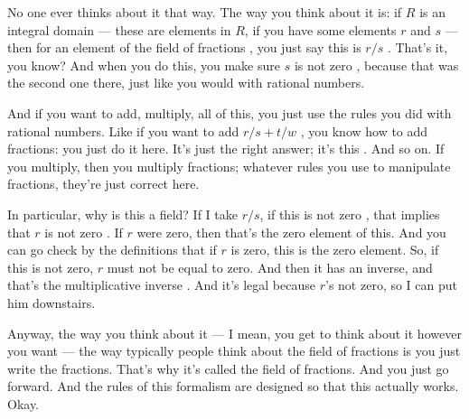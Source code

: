 \begin{speech}[00:01:46 - 00:03:25]
No one ever thinks about it that way. The way you think about it is: if $R$ is an integral domain  --- these are elements in $R$, if you have some elements $r$ and $s$ --- then for an element of the field of fractions , you just say this is $r/s$ . That's it, you know? And when you do this, you make sure $s$ is not zero , because that was the second one there, just like you would with rational numbers.

And if you want to add, multiply, all of this, you just use the rules you did with rational numbers. Like if you want to add $r/s + t/w$ , you know how to add fractions: you just do it here. It's just the right answer; it's this . And so on. If you multiply, then you multiply fractions; whatever rules you use to manipulate fractions, they're just correct here.

In particular, why is this a field? If I take $r/s$, if this is not zero , that implies that $r$ is not zero . If $r$ were zero, then that's the zero element of this. And you can go check by the definitions that if $r$ is zero, this is the zero element. So, if this is not zero, $r$ must not be equal to zero. And then it has an inverse, and that's the multiplicative inverse . And it's legal because $r$'s not zero, so I can put him downstairs.

Anyway, the way you think about it --- I mean, you get to think about it however you want --- the way typically people think about the field of fractions is you just write the fractions. That's why it's called the field of fractions. And you just go forward. And the rules of this formalism are designed so that this actually works. Okay.
\end{speech}


